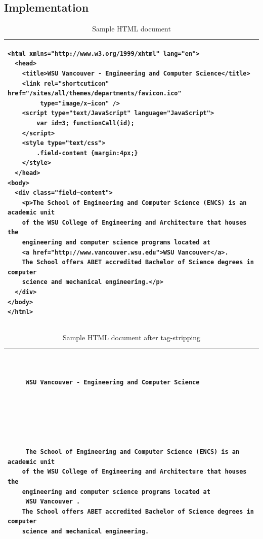 \documentclass[letterpaper,11pt,twoside]{article}
\begin{document}
\subsection{Implementation}
\begin{table}[htb]
\centering
\begin{tabular}{|p{\textwidth}|}
\hline
\begin{verbatim}
<html xmlns="http://www.w3.org/1999/xhtml" lang="en">
  <head>
    <title>WSU Vancouver - Engineering and Computer Science</title>
    <link rel="shortcuticon" href="/sites/all/themes/departments/favicon.ico" 
         type="image/x−icon" />
    <script type="text/JavaScript" language="JavaScript">
        var id=3; functionCall(id);
    </script>
    <style type="text/css">
        .field-content {margin:4px;}
    </style>
  </head>
<body>
  <div class="field−content">
    <p>The School of Engineering and Computer Science (ENCS) is an academic unit
    of the WSU College of Engineering and Architecture that houses the
    engineering and computer science programs located at
    <a href="http://www.vancouver.wsu.edu">WSU Vancouver</a>.
    The School offers ABET accredited Bachelor of Science degrees in computer
    science and mechanical engineering.</p>
  </div>
</body>
</html>
\end{verbatim}\\
\hline
\end{tabular}
\caption{Sample HTML document}
\label{tab:samplepage}
\end{table}

\begin{table}[htb]
\centering
\begin{tabular}{|p{\textwidth}|}
\hline
\begin{verbatim}
 
   
     WSU Vancouver - Engineering and Computer Science 
     
     
     
   
 
   
     The School of Engineering and Computer Science (ENCS) is an academic unit
    of the WSU College of Engineering and Architecture that houses the
    engineering and computer science programs located at
     WSU Vancouver .
    The School offers ABET accredited Bachelor of Science degrees in computer
    science and mechanical engineering. 
   
 
 


\end{verbatim}\\
\hline
\end{tabular}
\caption{Sample HTML document after tag-stripping}
\label{tab:samplepage_stripped}
\end{table}
\end{document}
